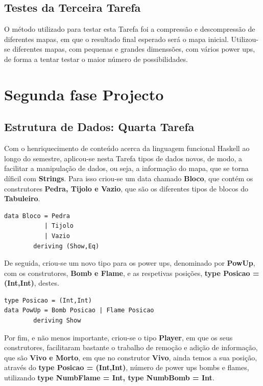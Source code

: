 \documentclass[4apaper]{report}
\begin{document}
%
\subsection{Testes da Terceira Tarefa}
O método utilizado para testar esta Tarefa foi a compressão e descompressão de diferentes mapas, em que o resultado final esperado será o mapa inicial. Utilizou-se diferentes mapas, com pequenas e grandes dimenssões, com vários power ups, de forma a tentar testar o maior número de possibilidades.

\section{Segunda fase Projecto}
\label{sec:segundafase}

\subsection{Estrutura de Dados: Quarta Tarefa}
Com o henriquecimento de conteúdo acerca da linguagem funcional Haskell ao longo do semestre, aplicou-se nesta Tarefa tipos de dados novos, de modo, a facilitar a manipulação de dados, ou seja, a informação do mapa, que se torna díficil com \textbf{Strings}. Para isso criou-se um data chamado \textbf{Bloco}, que contém os construtores \textbf{Pedra, Tijolo e Vazio}, que são os diferentes tipos de blocos do \textbf{Tabuleiro}. 

\begin{verbatim}
data Bloco = Pedra 
           | Tijolo 
           | Vazio 
        deriving (Show,Eq)
\end{verbatim}

De seguida, criou-se um novo tipo para os power ups, denominado por \textbf{PowUp}, com os construtores, \textbf{Bomb e Flame}, e as respetivas posições, \textbf{type Posicao = (Int,Int)}, destes. 

\begin{verbatim}
type Posicao = (Int,Int)
data PowUp = Bomb Posicao | Flame Posicao 
        deriving Show
\end{verbatim}

Por fim, e não menos importante, criou-se o tipo \textbf{Player}, em que os seus construtores, facilitaram bastante o trabalho de remoção e adição de informação, que são \textbf{Vivo e Morto}, em que no construtor \textbf{Vivo}, ainda temos a sua posição, através do \textbf{type Posicao = (Int,Int)}, número de power ups bombs e flames, utilizando \textbf{type NumbFlame = Int, type NumbBomb = Int}. 
\end{document}
